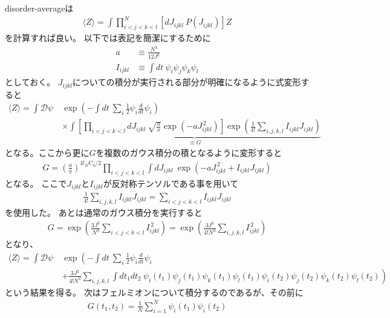 \documentclass[a4]{ltjsarticle}
\newcommand{\deriv}{\frac{d}{dt}}
\newcommand{\pathint}[1]{\int \mathcal{D}#1 \ }
\newcommand{\average}[1]{\langle #1 \rangle}
\newcommand{\combination}[2]{{}_{#1} \mathrm{C}_{#2}}
\begin{document}
	disorder-averageは
	\begin{align}
	\average{Z} = \int \prod_{i<j<k<l}^{N}\left[dJ_{ijkl}\ P(J_{ijkl})\right]Z
	\end{align}
	を計算すれば良い。
	以下では表記を簡潔にするために
	\begin{align}
	a &\equiv \frac{N^3}{12J^2}\\
	I_{ijkl} &\equiv \int dt\ \psi_i\psi_j\psi_k\psi_l
	\end{align}
	としておく。
	$J_{ijkl}$についての積分が実行される部分が明確になるように式変形すると
	\begin{align}
	\average{Z} = 
		\pathint{\psi} &\exp\left(- \int dt\ \sum_i \frac{1}{2}\psi_i\deriv\psi_i\right)
		\nonumber\\
		&\times \underbrace{\int \left[\prod_{i<j<k<l}
			dJ_{ijkl}\ \sqrt{\frac{a}{\pi}} \exp\left(-aJ_{ijkl}^{\, 2}\right)
			\right]
			\exp\left(\frac{1}{4!}\sum_{i,j,k,l}I_{ijkl}J_{ijkl}\right)}_{\equiv G}
	\end{align}
	となる。ここから更に$G$を複数のガウス積分の積となるように変形すると
	\begin{align}
	G = \left(\frac{a}{\pi}\right)^{4!\combination{N}{4} / 2}
		\prod_{i<j<k<l}\int dJ_{ijkl}\ \exp\left(
		-aJ_{ijkl}^{\, 2} + I_{ijkl}J_{ijkl}
		\right)
	\end{align}
	となる。
	ここで$J_{ijkl}$と$I_{ijkl}$が反対称テンソルである事を用いて
	\begin{align}
	\frac{1}{4!}\sum_{i,j,k,l}I_{ijkl}J_{ijkl} = \sum_{i<j<k<l}I_{ijkl}J_{ijkl}
	\end{align}
	を使用した。
	あとは通常のガウス積分を実行すると
	\begin{align}
	G = \exp\left(\frac{3J^2}{N^3}\sum_{i<j<k<l}I_{ijkl}^{\, 2}\right)
	  = \exp\left(\frac{3J^2}{4!N^3}\sum_{i,j,k,l}I_{ijkl}^{\, 2}\right)
	\end{align}
	となり、
	\begin{align}
	\average{Z} = \pathint{\psi} &\exp\left(
	- \int dt\ \sum_i \frac{1}{2}\psi_i\deriv\psi_i \right. \nonumber\\
	&\left.
	+ \frac{3J^2}{4!N^3}\sum_{i,j,k,l}\int dt_1dt_2\ 
		\psi_i(t_1)\psi_j(t_1)\psi_k(t_1)\psi_l(t_1)
		\psi_i(t_2)\psi_j(t_2)\psi_k(t_2)\psi_l(t_2)
	\right)
	\end{align}
	という結果を得る。
	次はフェルミオンについて積分するのであるが、その前に
	\begin{align}
	G(t_1, t_2) = \frac{1}{N}\sum_{i = 1}^{N}\psi_i(t_1)\psi_i(t_2)
	\end{align}
\end{document}
